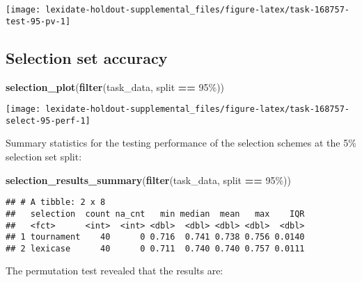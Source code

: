 \documentclass[
]{book}
\newenvironment{Shaded}{\begin{snugshade}}{\end{snugshade}}
\newcommand{\FunctionTok}[1]{\textcolor[rgb]{0.13,0.29,0.53}{\textbf{#1}}}
\newcommand{\NormalTok}[1]{#1}
\newcommand{\SpecialCharTok}[1]{\textcolor[rgb]{0.81,0.36,0.00}{\textbf{#1}}}
\newcommand{\StringTok}[1]{\textcolor[rgb]{0.31,0.60,0.02}{#1}}
\begin{document}
\texttt{[image: lexidate-holdout-supplemental\_files/figure-latex/task-168757-test-95-pv-1]}

\hypertarget{selection-set-accuracy-24}{%
\subsection{Selection set accuracy}\label{selection-set-accuracy-24}}

\begin{Shaded}
\begin{Highlighting}[]
\FunctionTok{selection\_plot}\NormalTok{(}\FunctionTok{filter}\NormalTok{(task\_data, split }\SpecialCharTok{==} \StringTok{\textquotesingle{}95\%\textquotesingle{}}\NormalTok{))}
\end{Highlighting}
\end{Shaded}

\texttt{[image: lexidate-holdout-supplemental\_files/figure-latex/task-168757-select-95-perf-1]}

Summary statistics for the testing performance of the selection schemes at the 5\% selection set split:

\begin{Shaded}
\begin{Highlighting}[]
\FunctionTok{selection\_results\_summary}\NormalTok{(}\FunctionTok{filter}\NormalTok{(task\_data, split }\SpecialCharTok{==} \StringTok{\textquotesingle{}95\%\textquotesingle{}}\NormalTok{))}
\end{Highlighting}
\end{Shaded}

\begin{verbatim}
## # A tibble: 2 x 8
##   selection  count na_cnt   min median  mean   max    IQR
##   <fct>      <int>  <int> <dbl>  <dbl> <dbl> <dbl>  <dbl>
## 1 tournament    40      0 0.716  0.741 0.738 0.756 0.0140
## 2 lexicase      40      0 0.711  0.740 0.740 0.757 0.0111
\end{verbatim}

The permutation test revealed that the results are:
\end{document}
